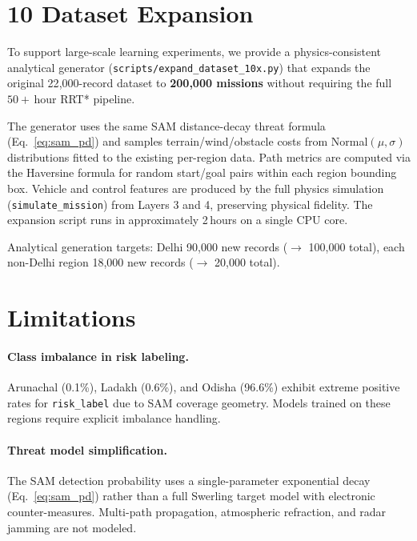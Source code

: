 ﻿\documentclass{article}
\begin{document}
\section{10\texttimes{} Dataset Expansion}
\label{sec:expansion}

To support large-scale learning experiments, we provide a physics-consistent
analytical generator (\texttt{scripts/expand\_dataset\_10x.py}) that expands
the original 22{,}000-record dataset to \textbf{200{,}000 missions} without
requiring the full $50+$\,hour RRT* pipeline.

The generator uses the same SAM distance-decay threat formula (Eq.~\ref{eq:sam_pd})
and samples terrain/wind/obstacle costs from Normal$(\mu, \sigma)$ distributions
fitted to the existing per-region data. Path metrics are computed via the
Haversine formula for random start/goal pairs within each region bounding box.
Vehicle and control features are produced by the full physics simulation
(\texttt{simulate\_mission}) from Layers 3 and 4, preserving physical fidelity.
The expansion script runs in approximately 2\,hours on a single CPU core.

Analytical generation targets:
Delhi 90{,}000 new records ($\to$ 100{,}000 total),
each non-Delhi region 18{,}000 new records ($\to$ 20{,}000 total).

\section{Limitations}
\label{sec:limitations}

\paragraph{Class imbalance in risk labeling.}
Arunachal (0.1\%), Ladakh (0.6\%), and Odisha (96.6\%) exhibit extreme
positive rates for \texttt{risk\_label} due to SAM coverage geometry.
Models trained on these regions require explicit imbalance handling.

\paragraph{Threat model simplification.}
The SAM detection probability uses a single-parameter exponential decay
(Eq.~\ref{eq:sam_pd}) rather than a full Swerling target model with
electronic counter-measures. Multi-path propagation, atmospheric refraction,
and radar jamming are not modeled.
\end{document}
